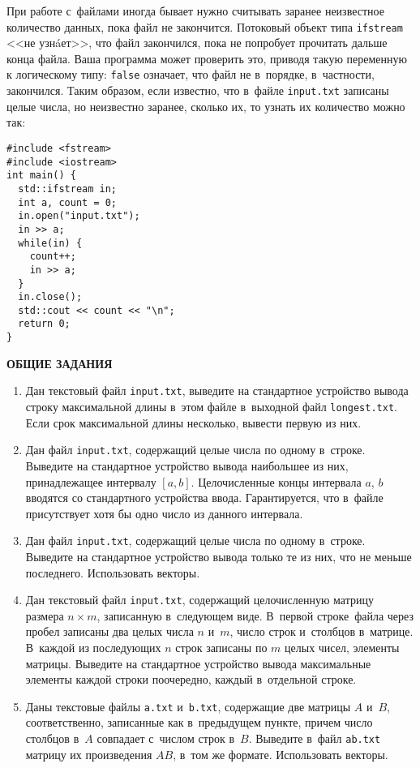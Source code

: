 \documentclass{article}
\begin{document}
При работе с~файлами иногда бывает нужно считывать заранее неизвестное количество данных, пока файл не закончится. Потоковый объект типа \texttt{ifstream} <<не узнáет>>, что файл закончился, пока не попробует прочитать дальше конца файла. Ваша программа может проверить это, приводя такую переменную к логическому типу: \texttt{false} означает, что файл не в~порядке, в~частности, закончился. Таким образом, если известно, что в~файле \texttt{input.txt} записаны целые числа, но неизвестно заранее, сколько их, то узнать их количество можно так:

\begin{verbatim}
#include <fstream>
#include <iostream>
int main() {
  std::ifstream in;
  int a, count = 0;
  in.open("input.txt");
  in >> a;
  while(in) {
    count++;
    in >> a;
  }
  in.close();
  std::cout << count << "\n";
  return 0;
}
\end{verbatim}






\newpage






\begin{center}
\textbf{ОБЩИЕ ЗАДАНИЯ}
\end{center}

\sloppy
\begin{enumerate}
\item
Дан текстовый файл \texttt{input.txt}, выведите на стандартное устройство вывода строку максимальной длины в~этом файле в~выходной файл \texttt{longest.txt}. Если срок максимальной длины несколько, вывести первую из них.
\item
Дан файл \texttt{input.txt}, содержащий целые числа по одному в~строке. Выведите на стандартное устройство вывода наибольшее из них, принадлежащее интервалу $[a, b]$. Целочисленные концы интервала $a$, $b$ вводятся со стандартного устройства ввода. Гарантируется, что в~файле присутствует хотя бы одно число из данного интервала.
\item
Дан файл \texttt{input.txt}, содержащий целые числа по одному в~строке. Выведите на стандартное устройство вывода только те из них, что не меньше последнего. Использовать векторы.
\item
Дан текстовый файл \texttt{input.txt}, содержащий целочисленную матрицу размера $n\times m$, записанную в~следующем виде. В~первой строке файла через пробел записаны два целых числа $n$ и~$m$, число строк и~столбцов в~матрице. В~каждой из последующих $n$ строк записаны по $m$ целых чисел, элементы матрицы. Выведите на стандартное устройство вывода максимальные элементы каждой строки поочередно, каждый в~отдельной строке.
\item
Даны текстовые файлы \texttt{a.txt} и~\texttt{b.txt}, содержащие две матрицы $A$ и~$B$, соответственно, записанные как в~предыдущем пункте, причем число столбцов в~$A$ совпадает с~числом строк в~$B$. Выведите в~файл \texttt{ab.txt} матрицу их произведения $AB$, в~том же формате. Использовать векторы.
\end{enumerate}
\end{document}
